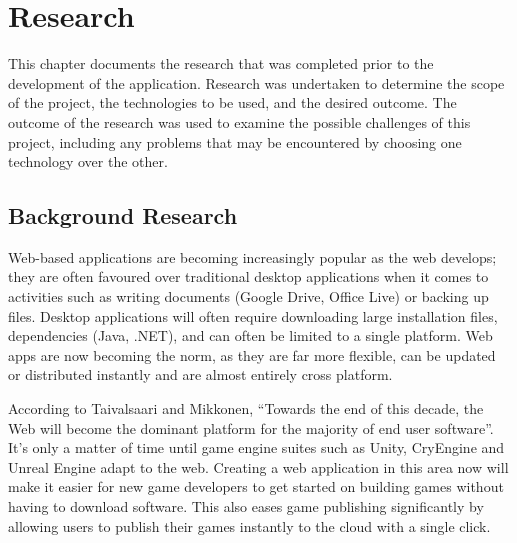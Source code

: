 \chapter{Research}
\label{chapter:research}

This chapter documents the research that was completed prior to the development of the application. Research was undertaken to determine the scope of the project, the technologies to be used, and the desired outcome. The outcome of the research was used to examine the possible challenges of this project, including any problems that may be encountered by choosing one technology over the other.


\section{Background Research}

Web-based applications are becoming increasingly popular as the web develops; they are often favoured over traditional desktop applications when it comes to activities such as writing documents (Google Drive, Office Live) or backing up files.\cite{6068340} Desktop applications will often require downloading large installation files, dependencies (Java, .NET), and can often be limited to a single platform. Web apps are now becoming the norm, as they are far more flexible, can be updated or distributed instantly and are almost entirely cross platform.\cite{5936687}

According to Taivalsaari and Mikkonen, ``Towards the end of this decade, the Web will become the dominant platform for the majority of 
end user software''.\cite{6068340} It's only a matter of time until game engine suites such as Unity\cite{unity}, CryEngine\cite{cryengine} and Unreal Engine\cite{unreal} adapt to the web. Creating a web application in this area now will make it easier for new game developers to get started on building games without having to download software. This also eases game publishing significantly by allowing users to publish their games instantly to the cloud with a single click.

